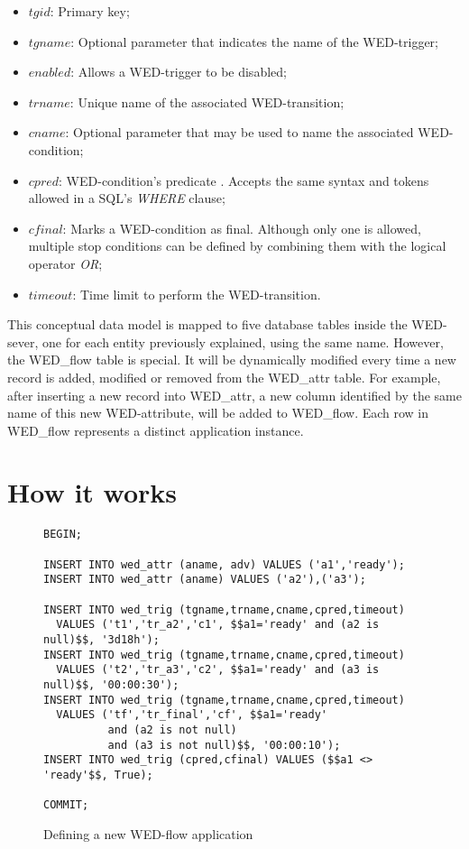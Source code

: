 \documentclass[12pt]{article}
\begin{document}
\begin{itemize}
\item $tgid$: Primary key; 
\item $tgname$: Optional parameter that indicates the name of the WED-trigger; 
\item $enabled$: Allows a WED-trigger to be disabled;
\item $trname$: Unique name of the associated WED-transition;
\item $cname$: Optional parameter that may  be used to name the associated WED-condition; 
\item $cpred$: WED-condition's predicate . Accepts the same syntax and tokens allowed in a SQL's \emph{WHERE} clause;
\item $cfinal$: Marks a WED-condition as final. Although only one is allowed, multiple stop conditions can be defined by combining them with the logical operator \emph{OR}; 
\item $timeout$: Time limit to perform the WED-transition. 
\end{itemize}

This conceptual data model is mapped to five database tables inside the WED-sever, one for each entity previously explained, using the same name. However, the WED\_flow table is special. It will be dynamically modified every time a new record is added, modified or removed from the WED\_attr table. For example, after inserting a new record into WED\_attr, a new column identified by  the same name of this new WED-attribute, will be added to WED\_flow. Each row in WED\_flow represents a distinct application instance. 

\section{How it works}
\label{sec:guts}
\begin{figure}[!t]
\begin{Verbatim}[fontsize=\tiny]
BEGIN;

INSERT INTO wed_attr (aname, adv) VALUES ('a1','ready');
INSERT INTO wed_attr (aname) VALUES ('a2'),('a3');

INSERT INTO wed_trig (tgname,trname,cname,cpred,timeout) 
  VALUES ('t1','tr_a2','c1', $$a1='ready' and (a2 is null)$$, '3d18h');
INSERT INTO wed_trig (tgname,trname,cname,cpred,timeout) 
  VALUES ('t2','tr_a3','c2', $$a1='ready' and (a3 is null)$$, '00:00:30');
INSERT INTO wed_trig (tgname,trname,cname,cpred,timeout) 
  VALUES ('tf','tr_final','cf', $$a1='ready' 
          and (a2 is not null) 
          and (a3 is not null)$$, '00:00:10');
INSERT INTO wed_trig (cpred,cfinal) VALUES ($$a1 <> 'ready'$$, True);

COMMIT;
\end{Verbatim}
\caption{Defining a new WED-flow application}
\label{code_new}
\end{figure}
 
\end{document}
